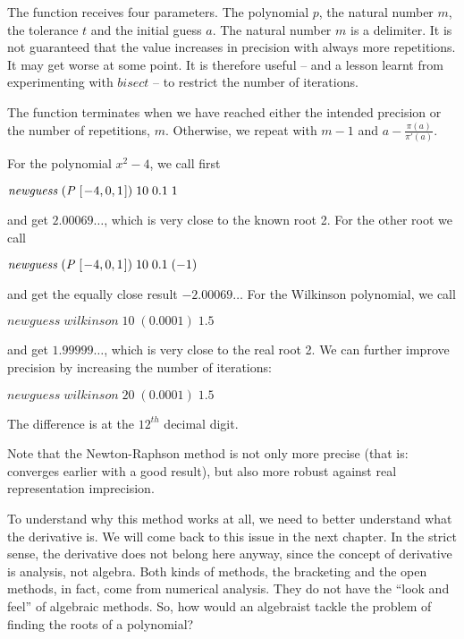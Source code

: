\documentclass[tikz]{scrreprt}
\newcommand{\Conid}[1]{\mathit{#1}}
\newcommand{\Varid}[1]{\mathit{#1}}
\begin{document}
The function receives four parameters.
The polynomial \ensuremath{\Varid{p}}, the natural number \ensuremath{\Varid{m}},
the tolerance \ensuremath{\Varid{t}} and the initial guess \ensuremath{\Varid{a}}.
The natural number \ensuremath{\Varid{m}} is a delimiter.
It is not guaranteed that the value increases
in precision with always more repetitions.
It may get worse at some point.
It is therefore useful --
and a lesson learnt from experimenting with
\ensuremath{\Varid{bisect}} -- to restrict the number
of iterations.

The function terminates when we have 
reached either the intended precision or 
the number of repetitions, $m$.
Otherwise, we repeat with $m-1$ and
$a - \frac{\pi(a)}{\pi'(a)}$.

For the polynomial $x^2 - 4$, we call first

\ensuremath{\Varid{newguess}\;(\Conid{P}\;[\mskip1.5mu \mathbin{-}\mathrm{4},\mathrm{0},\mathrm{1}\mskip1.5mu])\;\mathrm{10}\;\mathrm{0.1}\;\mathrm{1}}

and get $2.00069\dots$, which is very close
to the known root 2.
For the other root we call

\ensuremath{\Varid{newguess}\;(\Conid{P}\;[\mskip1.5mu \mathbin{-}\mathrm{4},\mathrm{0},\mathrm{1}\mskip1.5mu])\;\mathrm{10}\;\mathrm{0.1}\;(\mathbin{-}\mathrm{1})}

and get the equally close result $-2.00069\dots$
For the Wilkinson polynomial, we call

\ensuremath{\Varid{newguess}\;\Varid{wilkinson}\;\mathrm{10}\;(\mathrm{0.0001})\;\mathrm{1.5}}

and get $1.99999\dots$, which is very close
to the real root 2. We can further improve
precision by increasing the number of iterations:

\ensuremath{\Varid{newguess}\;\Varid{wilkinson}\;\mathrm{20}\;(\mathrm{0.0001})\;\mathrm{1.5}}

The difference is at the $12^{th}$ decimal digit.

Note that the Newton-Raphson method
is not only more precise (that is: converges earlier
with a good result), but also more robust against
real representation imprecision.

To understand why this method works at all,
we need to better understand what the derivative is.
We will come back to this issue in the next chapter.
In the strict sense, the derivative does not belong
here anyway, since the concept of derivative is
analysis, not algebra. Both kinds of methods,
the bracketing and the open methods, in fact, come
from numerical analysis.
They do not have the ``look and feel'' of algebraic
methods. So, how would an algebraist tackle the
problem of finding the roots of a polynomial?
\end{document}
